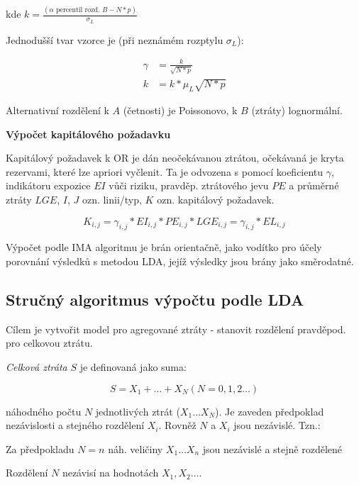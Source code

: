 \documentclass{article}
\begin{document}
kde $k = \frac{(\alpha \textrm{ percentil rozd. } B - N * p)}{\sigma_L}$

Jednodušší tvar vzorce je (při neznámém rozptylu $\sigma_L$):

\begin{equation}
  \begin{aligned}
  \gamma &= \frac{k}{\sqrt{N * p}} \\
       k &= k * \mu_L \sqrt{N * p}
  \end{aligned}
\end{equation}

Alternativní rozdělení k $A$ (četnosti) je Poissonovo, k $B$ (ztráty) lognormální.

\textbf{Výpočet kapitálového požadavku}

Kapitálový požadavek k OR je dán neočekávanou ztrátou, očekávaná je kryta rezervami, které lze apriori vyčlenit. Ta je odvozena s pomocí koeficientu $\gamma$, indikátoru expozice $EI$ vůči riziku, pravděp. ztrátového jevu $PE$ a průměrné ztráty $LGE$, $I$, $J$ ozn. linii/typ, $K$ ozn. kapitálový požadavek.

\begin{equation}
  K_{i,j} = \gamma_{i,j} * EI_{i,j} * PE_{i,j} * LGE_{i,j} = \gamma_{i,j} * EL_{i,j}
\end{equation}


Výpočet podle IMA algoritmu je brán orientačně, jako vodítko pro účely porovnání výsledků s metodou LDA, jejíž výsledky jsou brány jako směrodatné.



\subsection{Stručný algoritmus výpočtu podle LDA}

Cílem je vytvořit model pro agregované ztráty - stanovit rozdělení pravděpod. pro celkovou ztrátu.

\emph{Celková ztráta} $S$ je definovaná jako suma:

\begin{equation}
  S = X_1+…+X_N (N = 0,1,2 \ldots)
\end{equation}
  
náhodného počtu $N$ jednotlivých ztrát ($X_1 \ldots X_N$). Je zaveden předpoklad nezávislosti a stejného rozdělení $X_i$. Rovněž $N$ a $X_i$ jsou nezávislé. Tzn.:

\begin{compactitem}
\item Za předpokladu $N = n$ náh. veličiny $X_1 \ldots X_n$ jsou nezávislé a stejně rozdělené
\item Rozdělení $N$ nezávisí na hodnotách $X_1,X_2 \ldots$.
\end{compactitem}
  
\end{document}
